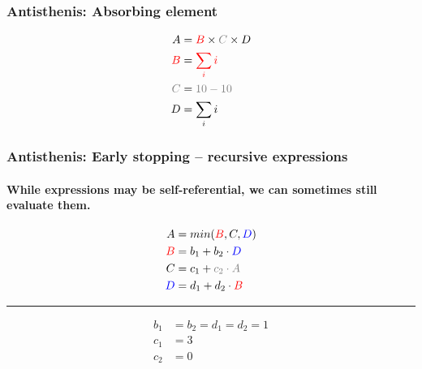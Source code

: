 \begin{frame}
  \frametitle{Antisthenis: Absorbing element}
  \begin{align*}
    A &= {\color{red}B} \times {\color{gray}C} \times D \\
    {\color{red}B} &= {\color{red}\sum_i{i}} \\
    {\color{gray}C} &= {\color{gray}10 - 10} \\
    D &= \sum_i{i}
  \end{align*}
\end{frame}


\begin{frame}
  \frametitle{Antisthenis: Early stopping -- recursive expressions}
  \framesubtitle{While expressions may be self-referential, we can
    sometimes still evaluate them.}
  \begin{align*}
    A &= min({\color{red}B}, C, {\color{blue}D}) \\
    {\color{red}B} &= b_1 + b_2 \cdot {\color{blue}D} \\
    C &= c_1 + {\color{gray}c_2 \cdot A} \\
    {\color{blue}D} &= d_1 + d_2 \cdot {\color{red}B} \\
  \end{align*}
  \hrule
  \begin{align*}
    b_1 &= b_2 = d_1 = d_2 = 1 \\
    c_1 &= 3 \\
    c_2 &= 0
  \end{align*}
\end{frame}
